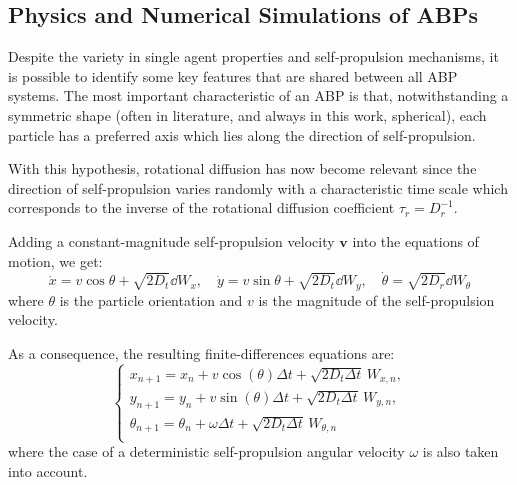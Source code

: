 \documentclass[../../master_thesis_np.tex]{subfiles}
\begin{document}
	\subsection[ABP simulations]{Physics and Numerical Simulations of ABPs}
		Despite the variety in single agent properties and self-propulsion mechanisms, it is possible to identify some key features that are shared between all ABP systems. The most important characteristic of an ABP is that, notwithstanding a symmetric shape (often in literature, and always in this work, spherical), each particle has a preferred axis which lies along the direction of self-propulsion.
		
		With this hypothesis, rotational diffusion has now become relevant since the direction of self-propulsion varies randomly with a characteristic time scale which corresponds to the inverse of the rotational diffusion coefficient $\tau_r = D_r^{-1}$. 
		
		Adding a constant-magnitude self-propulsion velocity $\mathbf{v}$ into the equations of motion, we get:
		\begin{equation}
			\dot{x} = v \cos{\theta} + \sqrt{2D_t}\dd{W_x} , \quad \dot{y} = v \sin{\theta} + \sqrt{2D_t}\dd{W_y}, \quad \dot{\theta} = \sqrt{2D_r}\dd{W_{\theta}}
		\end{equation}
		where $\theta$ is the particle orientation and $v$ is the magnitude of the self-propulsion velocity.
		
		As a consequence, the resulting finite-differences equations are:
		\begin{equation} \label{eq:fin_diff1}
			\begin{cases}
				x_{n+1} = x_n + v \cos(\theta) \Delta t + \sqrt{2D_t \Delta t} \, W_{x,n},\\
				y_{n+1} = y_n + v \sin(\theta) \Delta t + \sqrt{2D_t \Delta t} \, W_{y,n},\\
				\theta_{n+1} = \theta_n + \omega \Delta t + \sqrt{2D_t \Delta t} \, W_{\theta,n}\\
			\end{cases}
		\end{equation}
		where the case of a deterministic self-propulsion angular velocity $\omega$ is also taken into account.
		
\end{document}
